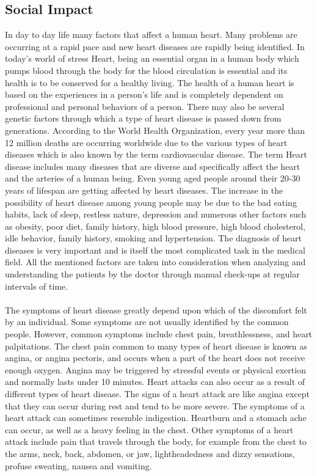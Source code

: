 \documentclass{book}
\begin{document}
    \subsection{Social Impact}
    In day to day life many factors that affect a human heart. Many problems are occurring at a rapid pace and new heart diseases are rapidly being identified. In today’s world of stress Heart, being an essential organ in a human body which pumps blood through the body for the blood circulation is essential and its health is to be conserved for a healthy living. The health of a human heart is based on the experiences in a person’s life and is completely dependent on professional and personal behaviors of a person. There may also be several genetic factors through which a type of heart disease is passed down from generations. According to the World Health Organization, every year more than 12 million deaths are occurring worldwide due to the various types of heart diseases which is also known by the term cardiovascular disease. The term Heart disease includes many diseases that are diverse and specifically affect the heart and the arteries of a human being. Even young aged people around their 20-30 years of lifespan are getting affected by heart diseases. The increase in the possibility of heart disease among young people may be due to the bad eating habits, lack of sleep, restless nature, depression and numerous other factors such as obesity, poor diet, family history, high blood pressure, high  blood cholesterol, idle behavior, family history, smoking and hypertension.  The diagnosis of heart diseases is very important and is itself the most  complicated task in the medical field. All the mentioned factors are taken into consideration when analyzing and understanding the patients by the doctor through manual check-ups at regular intervals of time.
    \paragraph{}
    The symptoms of heart disease greatly depend upon which of the discomfort felt by an individual. Some symptoms are not usually identified by the common people. However, common symptoms include chest pain, breathlessness, and heart palpitations. The chest pain common to many types of heart disease is known as angina, or angina pectoris, and occurs when a part of the heart does not receive enough oxygen. Angina may be triggered by stressful events or physical exertion and normally lasts under 10 minutes. Heart attacks can also occur as a result of different types of heart disease. The signs of a heart attack are like angina except that they can occur during rest and tend to be more severe. The symptoms of a heart attack can sometimes resemble indigestion. Heartburn and a stomach ache can occur, as well as a heavy feeling in the chest. Other symptoms of a heart attack include pain that travels through the body, for example from the chest to the arms, neck, back, abdomen, or jaw, lightheadedness and dizzy sensations, profuse sweating, nausea and vomiting.
\end{document}
